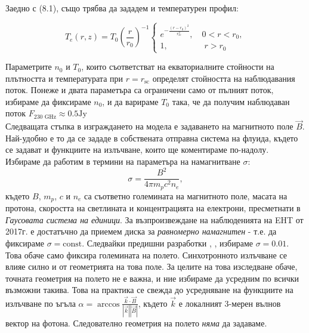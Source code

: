 Заедно с (8.1), също трябва да зададем и температурен профил:

\begin{equation}
	T_e(r,z) = T_0\left(\frac{r}{r_0}\right)^{-1}
	\begin{cases}
		e^{-\frac{(r-r_0)^2}{r^2_{\text{sc}}}},\quad 0 < r < r_0,\\
		1,\,\,\qquad\qquad r>r_0
	\end{cases}
\end{equation}

Параметрите $n_0$ и $T_0$, които съответстват на екваториалните стойности на плътността и температурата при $r = r_\text{sc}$ определят стойността на наблюдавания поток. Понеже и двата параметъра са ограничени само от пълният поток, избираме да фиксираме $n_0$, и да варираме $T_0$ така, че да получим наблюдаван поток $F_{\text{230 GHz}} \approx 0.5 \text{Jy}$\\

Следващата стъпка в изграждането на модела е задаването на магнитното поле $\vec{B}$. Най-удобно е то да се зададе в собствената отправна система на флуида, където се задават и функциите на излъчване, които ще коментираме по-надолу. Избираме да работим в термини на параметъра на намагнитване $\sigma$:
\begin{equation}
	\sigma = \frac{B^2}{4\pi m_pc^2n_e},
\end{equation}
където $B$, $m_p$, $c$ и $n_e$ са съответно големината на магнитното поле, масата на протона, скоростта на светлината и концентрацията на електрони, пресметнати в \emph{Гаусовата система на единици}. За възпроизвеждане на наблюденията на EHT от 2017г. е достатъчно да приемем диска за \emph{равномерно намагнитен} - т.е. да фиксираме $\sigma = \text{const}$. Следвайки предишни разработки \cite{KERR_SIM_PAPER}, \cite{Geometric_Modeling}, избираме $\sigma = 0.01$. Това обаче само фиксира големината на полето. Синхотронното излъчване се влияе силно и от геометрията на това поле. За целите на това изследване обаче, точната геометрия на полето не е важна, и ние избираме да усредним по всички възможни такива. Това на практика се свежда до усредняване на функциите на излъчване по ъгъла $\alpha = \arccos\frac{\vec{k}\cdot\vec{B}}{|\vec{k}||\vec{B}|}$, където $\vec{k}$ е локалният 3-мерен вълнов вектор на фотона. Следователно геометрия на полето \emph{няма} да задаваме.\\

